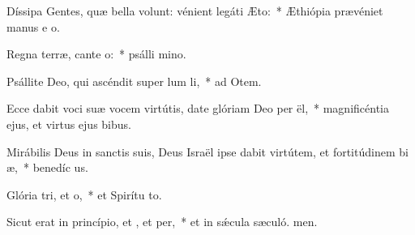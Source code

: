 \item Díssipa Gentes, quæ bella volunt: vénient legáti  Æto:~* Æthiópia prævéniet manus e o.
\item Regna terræ, cante o:~* psálli mino.
\item Psállite Deo, qui ascéndit super lum li,~* ad Otem.
\item Ecce dabit voci suæ vocem virtútis, date glóriam Deo per ël,~* magnificéntia ejus, et virtus ejus  bibus.
\item Mirábilis Deus in sanctis suis, Deus Israël ipse dabit virtútem, et fortitúdinem bi æ,~* benedíc us.
\item Glória tri, et o,~* et Spirítu to.
\item Sicut erat in princípio, et , et per,~* et in sǽcula sæculó. men.

